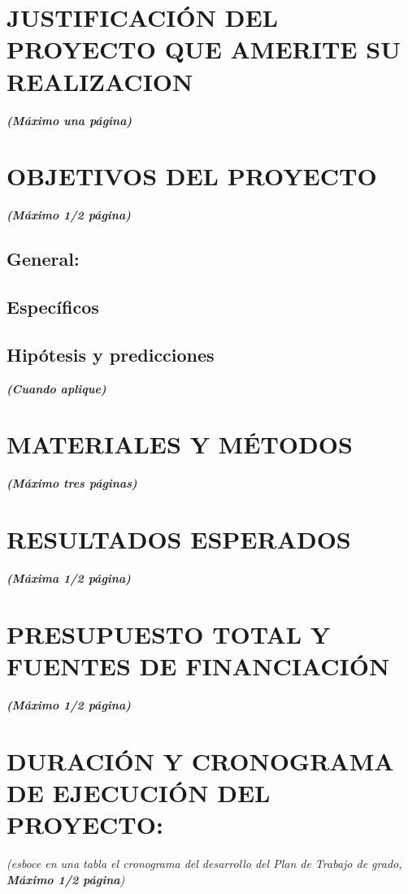 \documentclass[12pt,letterpaper]{article}
\begin{document}
\section{JUSTIFICACIÓN DEL PROYECTO QUE AMERITE SU REALIZACION}
\emph{\textbf{(Máximo una página)}}\\

\section{OBJETIVOS DEL PROYECTO}
\emph{\textbf{(Máximo 1/2 página)}}
\subsection{General:}

\subsection{Específicos}

\subsection{Hipótesis y predicciones}
\emph{\textbf{(Cuando aplique)}}
\section{MATERIALES Y MÉTODOS}
\emph{\textbf{(Máximo tres páginas)}}




\section{RESULTADOS ESPERADOS}
\emph{\textbf{(Máxima 1/2 página)}}\\

\section{PRESUPUESTO TOTAL Y FUENTES DE FINANCIACIÓN}
\emph{\textbf{(Máximo 1/2 página)}}

\section{DURACIÓN Y CRONOGRAMA DE EJECUCIÓN DEL PROYECTO:}
\emph{(esboce en una tabla el cronograma del desarrollo del Plan de Trabajo de grado, \textbf{Máximo 1/2 página})}
\end{document}
